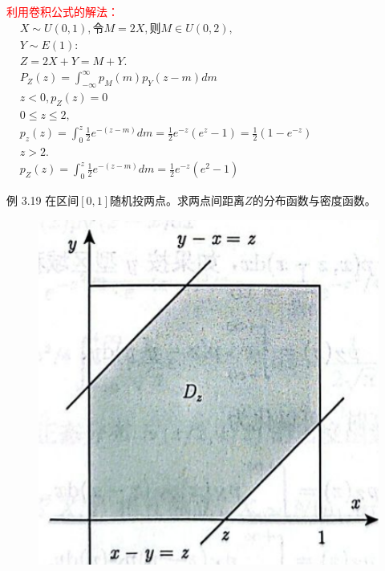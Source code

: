 \documentclass{beamer}
\newcommand{\new}[1]{\textcolor{red}{#1}}
\begin{document}
	\begin{frame}
		\new{利用卷积公式的解法：}
		$\begin{aligned} & X \sim U(0,1), \text {令} M=2 X, \text {则} M \in U(0,2), \\ & Y \sim E(1): \\ & Z=2 X+Y=M+Y . \\ & P_Z(z)=\int_{-\infty}^{\infty} p_M(m) p_Y(z-m) d m \\ & z<0, p_Z(z)=0 \\ & 0 \leqslant z \leqslant 2, \\ & p_z(z)=\int_0^z \frac{1}{2} e^{-(z-m)} d m=\frac{1}{2} e^{-z}\left(e^z-1\right)=\frac{1}{2}\left(1-e^{-z}\right) \\ & z>2 . \\ & p_Z(z)=\int_0^z \frac{1}{2} e^{-(z-m)} d m=\frac{1}{2} e^{-z}\left(e^2-1\right)\end{aligned}$
	\end{frame}
	\begin{frame}
		例 3.19 在区间$[0, 1]$随机投两点。求两点间距离$Z$的分布函数与密度函数。
		\begin{figure}
			\centering
			\includegraphics[scale = 0.37]{figures/figure3-55.png}
		\end{figure}
	\end{frame}
	
\end{document}
